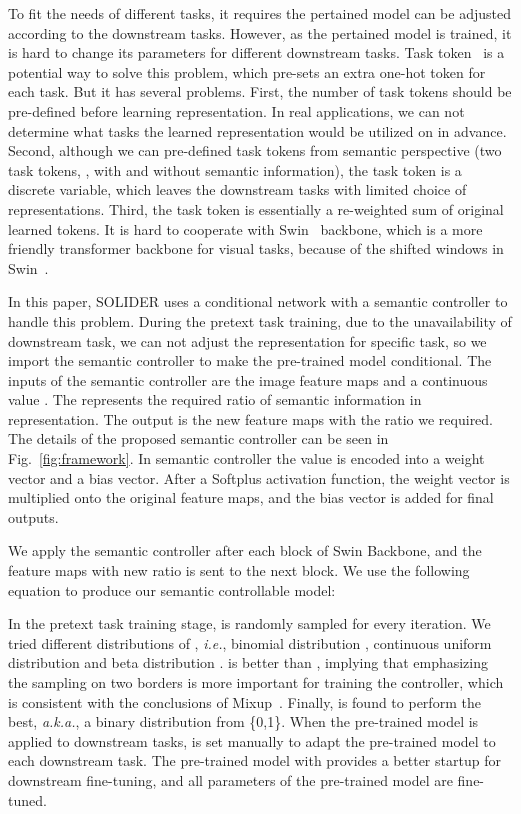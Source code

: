 \documentclass[10pt,twocolumn,letterpaper]{article}
\begin{document}
To fit the needs of different tasks, it requires the pertained model can be adjusted according to the downstream tasks. However, as the pertained model is trained, it is hard to change its parameters for different downstream tasks. Task token~\cite{tasktoken} is a potential way to solve this problem, which pre-sets an extra one-hot token for each task. 
But it has several problems. First, the number of task tokens should be pre-defined before learning representation. In real applications, we can not determine what tasks the learned representation would be utilized on in advance. Second, although we can pre-defined task tokens from semantic perspective (two task tokens, \ie, with and without semantic information), the task token is a discrete variable, which leaves the downstream tasks with limited choice of representations. Third, the task token is essentially a re-weighted sum of original learned tokens. It is hard to cooperate with Swin~\cite{swin} backbone, which is a more friendly transformer backbone for visual tasks, because of the shifted windows in Swin~\cite{swin}.

In this paper, SOLIDER uses a conditional network with a semantic controller to handle this problem. 
During the pretext task training, due to the unavailability of downstream task, we can not adjust the representation for specific task, so we import the semantic controller to make the pre-trained model conditional. 
The inputs of the semantic controller are the image feature maps and a continuous value . The   represents the required ratio of semantic information in representation. The output is the new feature maps with the ratio we required. The details of the proposed semantic controller can be seen in Fig.~\ref{fig:framework}. In semantic controller the value  is encoded into a weight vector and a bias vector. After a Softplus activation function, the weight vector is multiplied onto the original feature maps, and the bias vector is added for final outputs. 


We apply the semantic controller after each block of Swin Backbone, and the feature maps  with new ratio  is sent to the next block. We use the following equation to produce our semantic controllable model: 

In the pretext task training stage,  is randomly sampled for every iteration. We tried different distributions of , \textit{i.e.}, binomial distribution , continuous uniform distribution  and beta distribution .  is better than , implying that emphasizing the sampling on two borders is more important for training the controller, which is consistent with the conclusions of Mixup~\cite{zhang2017mixup}. Finally,  is found to perform the best, \textit{a.k.a.}, a binary distribution from \{0,1\}. 
When the pre-trained model is applied to downstream tasks,  is set manually to adapt the pre-trained model to each downstream task. The pre-trained model with  provides a better startup for downstream fine-tuning, and all parameters of the pre-trained model are fine-tuned. 
\end{document}
